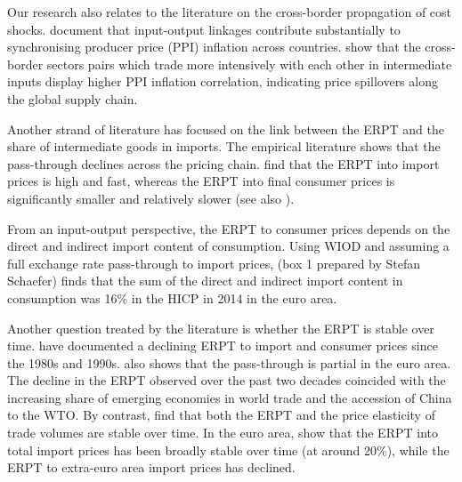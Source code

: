 \documentclass[11pt,a4paper]{article}
\begin{document}
Our research also relates to the literature on the cross-border propagation of cost shocks. 
\cite{Auer2019} document that input-output linkages contribute substantially to synchronising producer price (PPI) inflation across countries. %
\cite{AntoundeAlmeida2016} show that the cross-border sectors pairs which trade more intensively with each other in intermediate inputs display higher PPI inflation correlation, indicating  price spillovers along the global supply chain. 

Another strand of literature has focused on the link between the ERPT and the share of intermediate goods in imports. 
The empirical literature shows that the pass-through declines across the pricing chain. \cite{Ortega2020} find that the ERPT into import prices is high and fast, whereas the ERPT into final consumer prices is significantly smaller and relatively slower (see also \cite{Hahn2003, Kunovac2017, BenCheikh2017}).

From an input-output perspective, the ERPT to consumer prices depends on the direct and indirect import content of consumption. Using WIOD and assuming a full exchange rate pass-through to import prices, \cite{Ortega2020}{ (box 1 prepared by Stefan Schaefer)} finds that the sum of the direct and indirect import content in consumption was 16\% in the HICP in 2014 in the euro area.

Another question treated by the literature is whether the ERPT is stable over time. \cite{Campa2008} have documented a declining ERPT to import and consumer prices since the 1980s and 1990s. \cite{Ozyurt2016} also shows that the pass-through is partial in the euro area. The decline in the ERPT observed over the past two decades coincided with the increasing share of emerging economies in world trade and the accession of China to the WTO. By contrast, \cite{Leigh2017} find that both the ERPT and the price elasticity of trade volumes are stable over time. In the euro area, \cite{Ortega2020} show that the ERPT into total import prices has been broadly stable over time (at around 20\%), while the ERPT to extra-euro area import prices has declined.
\end{document}
